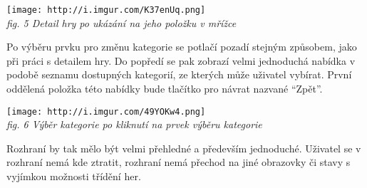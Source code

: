 \texttt{[image: http://i.imgur.com/K37enUq.png]}\\
\emph{fig. 5 Detail hry po ukázání na jeho položku v mřížce}

Po výběru prvku pro změnu kategorie se potlačí pozadí stejným způsobem,
jako při práci s detailem hry. Do popředí se pak zobrazí velmi
jednoduchá nabídka v podobě seznamu dostupných kategorií, ze kterých
může uživatel vybírat. První oddělená položka této nabídky bude tlačítko
pro návrat nazvané ``Zpět''.

\texttt{[image: http://i.imgur.com/49YOKw4.png]}\\
\emph{fig. 6 Výběr kategorie po kliknutí na prvek výběru kategorie}

Rozhraní by tak mělo být velmi přehledné a především jednoduché.
Uživatel se v rozhraní nemá kde ztratit, rozhraní nemá přechod na jiné
obrazovky či stavy s vyjímkou možnosti třídění her.
